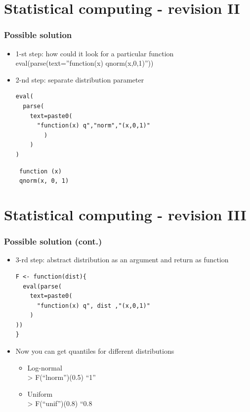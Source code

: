 \documentclass[bigger]{beamer}
\begin{document}
\section{Statistical computing - revision II}
\label{sec-7}
\begin{frame}[fragile]
\frametitle{Possible solution}
\label{sec-7-1}
\begin{itemize}

\item 1-st step: how could it look for a particular function\\
\label{sec-7-1-1}%
eval(parse(text=''function(x) qnorm(x,0,1)''))

\item 2-nd step: separate distribution parameter\\
\label{sec-7-1-2}%
\begin{verbatim}
eval(
  parse(
    text=paste0(
      "function(x) q","norm","(x,0,1)"
        )
    )
)
\end{verbatim}

\begin{verbatim}
 function (x) 
 qnorm(x, 0, 1)
\end{verbatim}

\end{itemize} %
\end{frame}
\section{Statistical computing - revision III}
\label{sec-8}
\begin{frame}[fragile]
\frametitle{Possible solution (cont.)}
\label{sec-8-1}
\begin{itemize}

\item 3-rd step: abstract distribution as an argument and return as function\\
\label{sec-8-1-1}%
\begin{verbatim}
F <- function(dist){
  eval(parse(
    text=paste0(
      "function(x) q", dist ,"(x,0,1)"
    )
))
}
\end{verbatim}



\item Now you can get quantiles for different distributions
\label{sec-8-1-2}%
\begin{itemize}

\item Log-normal\\
\label{sec-8-1-2-1}%
> F(``lnorm'')(0.5)
``1''

\item Uniform\\
\label{sec-8-1-2-2}%
> F(``unif'')(0.8)
``0.8
\end{itemize} %
\end{itemize} %
\end{frame}
\end{document}
